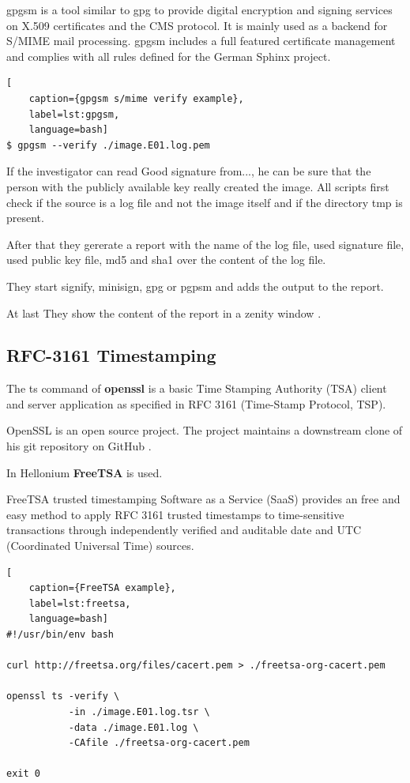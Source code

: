 gpgsm is a tool similar to gpg to provide digital encryption and signing services on X.509 certificates and the CMS protocol. It is mainly used as a backend for S/MIME mail processing. gpgsm includes a full featured certificate management and complies with all rules defined for the German Sphinx project.

\begin{lstlisting}[
    caption={gpgsm s/mime verify example},
    label=lst:gpgsm,
    language=bash]
$ gpgsm --verify ./image.E01.log.pem
\end{lstlisting}

\noindent If the investigator can read \glqq{}Good signature from...\grqq{}, he can be sure that the person with the publicly available key really created the image.\newline
\newline
\noindent All scripts first check if the source is a log file and not the image itself and if the directory tmp is present.

After that they gererate a report with the name of the log file, used signature file, used public key file, md5 and sha1 over the content of the log file.

They start signify, minisign, gpg or pgpsm and adds the output to the report.

At last They show the content of the report in a zenity window .

\subsection{RFC-3161 Timestamping}

The ts command of \textbf{openssl} is a basic Time Stamping Authority (TSA) client and server application as specified in RFC 3161 (Time-Stamp Protocol, TSP).

OpenSSL is an open source project. The project maintains a downstream clone of his git repository on GitHub \cite{OpenSSL}.

In Hellonium \textbf{FreeTSA} \cite{FreeTSA} is used.

FreeTSA trusted timestamping Software as a Service (SaaS) provides an free and easy method to apply RFC 3161 trusted timestamps to time-sensitive transactions through independently verified and auditable date and UTC (Coordinated Universal Time) sources.

\begin{lstlisting}[
    caption={FreeTSA example},
    label=lst:freetsa,
    language=bash]
#!/usr/bin/env bash

curl http://freetsa.org/files/cacert.pem > ./freetsa-org-cacert.pem

openssl ts -verify \
           -in ./image.E01.log.tsr \
           -data ./image.E01.log \
           -CAfile ./freetsa-org-cacert.pem
  
exit 0
\end{lstlisting}

